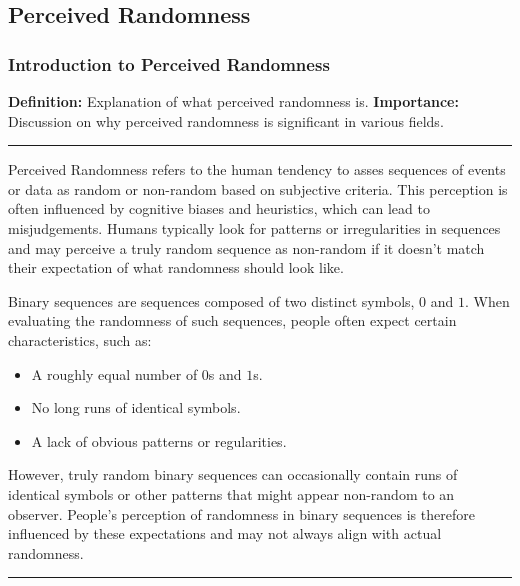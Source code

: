 \subsection{Perceived Randomness}
\subsubsection{Introduction to Perceived Randomness}
\textbf{Definition:} Explanation of what perceived randomness is.\newline
\textbf{Importance:} Discussion on why perceived randomness is significant in various fields.\newline
\noindent\rule{\textwidth}{0.1pt}
Perceived Randomness refers to the human tendency to asses sequences of events or data as random or non-random based on subjective criteria. This perception is often influenced by cognitive biases and heuristics, which can lead to misjudgements. Humans typically look for patterns or irregularities in sequences and may perceive a truly random sequence as non-random if it doesn't match their expectation of what randomness should look like.

Binary sequences are sequences composed of two distinct symbols, $0$ and $1$. When evaluating the randomness of such sequences, people often expect certain characteristics, such as:
\begin{itemize}
    \item A roughly equal number of $0$s and $1$s.
    \item No long runs of identical symbols.
    \item A lack of obvious patterns or regularities.
\end{itemize}
However, truly random binary sequences can occasionally contain runs of identical symbols or other patterns that might appear non-random to an observer. People's perception of randomness in binary sequences is therefore influenced by these expectations and may not always align with actual randomness.\newline
\noindent\rule{\textwidth}{0.1pt}

